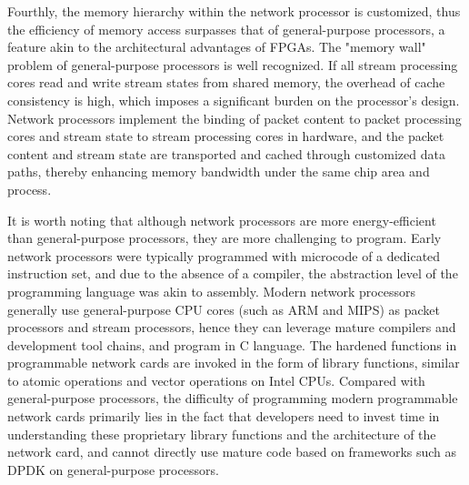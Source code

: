 Fourthly, the memory hierarchy within the network processor is customized, thus the efficiency of memory access surpasses that of general-purpose processors, a feature akin to the architectural advantages of FPGAs. The "memory wall" problem of general-purpose processors is well recognized. If all stream processing cores read and write stream states from shared memory, the overhead of cache consistency is high, which imposes a significant burden on the processor's design. Network processors implement the binding of packet content to packet processing cores and stream state to stream processing cores in hardware, and the packet content and stream state are transported and cached through customized data paths, thereby enhancing memory bandwidth under the same chip area and process.

It is worth noting that although network processors are more energy-efficient than general-purpose processors, they are more challenging to program. Early network processors were typically programmed with microcode of a dedicated instruction set, and due to the absence of a compiler, the abstraction level of the programming language was akin to assembly. Modern network processors generally use general-purpose CPU cores (such as ARM and MIPS) as packet processors and stream processors, hence they can leverage mature compilers and development tool chains, and program in C language. The hardened functions in programmable network cards are invoked in the form of library functions, similar to atomic operations and vector operations on Intel CPUs. Compared with general-purpose processors, the difficulty of programming modern programmable network cards primarily lies in the fact that developers need to invest time in understanding these proprietary library functions and the architecture of the network card, and cannot directly use mature code based on frameworks such as DPDK on general-purpose processors.

